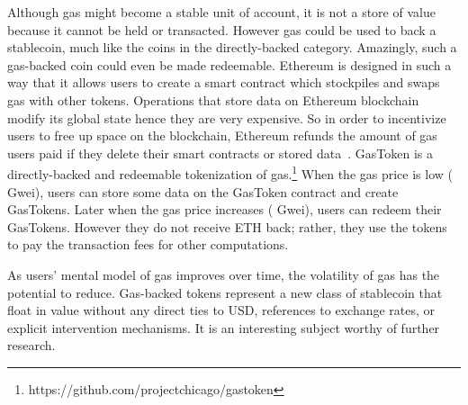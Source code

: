 Although gas might become a stable unit of account, it is not a store of value because it cannot be held or transacted. However gas could be used to back a stablecoin, much like the coins in the directly-backed category. Amazingly, such a gas-backed coin could even be made redeemable. Ethereum is designed in such a way that it allows users to create a smart contract which stockpiles and swaps gas with other tokens. Operations that store data on Ethereum blockchain modify its global state hence they are very expensive. So in order to incentivize users to free up space on the blockchain, Ethereum refunds the amount of gas users paid if they delete their smart contracts or stored data~\cite{wood2014ethereum}. GasToken is a directly-backed and redeemable tokenization of gas.\footnote{https://github.com/projectchicago/gastoken} When the gas price is low ( Gwei), users can store some data on the GasToken contract and create GasTokens. Later when the gas price increases ( Gwei), users can redeem their GasTokens. However they do not receive ETH back; rather, they use the tokens to pay the transaction fees for other computations. 

As users' mental model of gas improves over time, the volatility of gas has the potential to reduce. Gas-backed tokens represent a new class of stablecoin that float in value without any direct ties to USD, references to exchange rates, or explicit intervention mechanisms. It is an interesting subject worthy of further research. 




